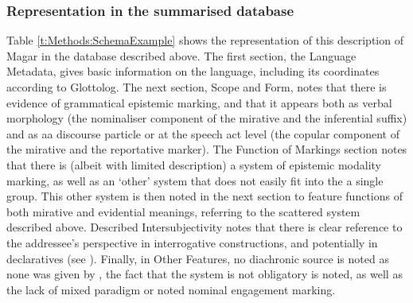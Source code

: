 \subsubsection{Representation in the summarised database}
Table \ref{t:Methods:SchemaExample} shows the representation of this description of Magar in the database described above. The first section, the Language Metadata, gives basic information on the language, including its coordinates according to Glottolog. The next section, Scope and Form, notes that there is evidence of grammatical epistemic marking, and that it appears both as verbal morphology (the nominaliser component of the mirative and the inferential suffix) and as aa discourse particle or at the speech act level (the copular component of the mirative and the reportative marker). The Function of Markings section notes that there is (albeit with limited description) a system of epistemic modality marking, as well as an `other' system that does not easily fit into the a single group. This other system is then noted in the next section to feature functions of both mirative and evidential meanings, referring to the scattered system described above. Described Intersubjectivity notes that there is clear reference to the addressee's perspective in interrogative constructions, and potentially in declaratives (see ). Finally, in Other Features, no diachronic source is noted as none was given by , the fact that the system is not obligatory is noted, as well as the lack of mixed paradigm or noted nominal engagement marking.
